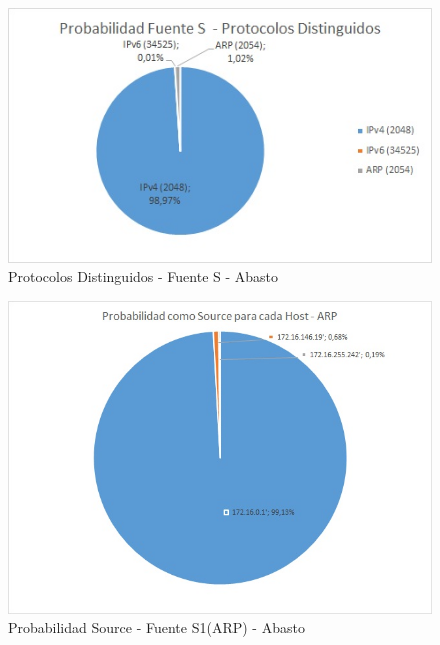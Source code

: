 \begin{figure}[h!]
\centering
\includegraphics[width=\textwidth]{./img/probaS_abasto.jpg}
\caption{Protocolos Distinguidos - Fuente S - Abasto}
\end{figure}
\newpage

\begin{figure}[h!]
\centering
\includegraphics[width=\textwidth]{./img/proba_src_abasto.jpg}
\caption{Probabilidad Source - Fuente S1(ARP) - Abasto}
\end{figure}

